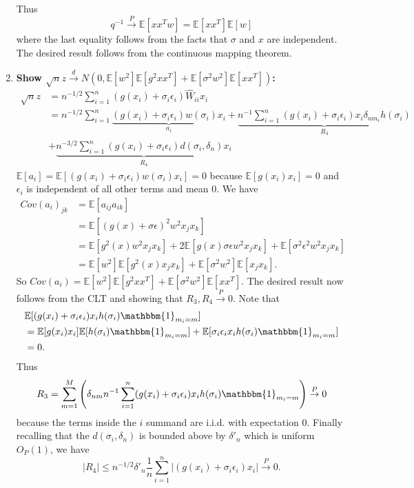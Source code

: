 \documentclass[ejs,ps,preprint]{imsart}
\numberwithin{equation}{section}
\theoremstyle{plain}
\newcommand{\E}{\mathbb{E}}
\newcommand{\ind}[1]{\mathbbm{1}_{#1}}
\newcommand{\rightarrowp}{\overset{P}{\to}}
\newcommand{\rightarrowd}{\overset{d}{\to}}
\def\E{\mathbb{E}}
\begin{document}
\begin{enumerate}
Thus 
\begin{equation*}
  q^{-1} \rightarrowp \E[xx^Tw] = \E[xx^T]\E[w]
\end{equation*}
where the last equality follows from the facts that $\sigma$ and $x$ are independent. The desired result follows from the continuous mapping theorem.
\item \textbf{Show $\sqrt{n}z \rightarrowd N(0,\E[w^2]\E[g^2xx^T] + \E[\sigma^2w^2]\E[xx^T])$:}\label{part:ii} 
\begin{align*}
\sqrt{n}z &= n^{-1/2} \sum_{i=1}^n (g(x_i) + \sigma_i\epsilon_i)\widehat{W}_{ii}x_{i}\\
&=n^{-1/2} \sum_{i=1}^n \underbrace{(g(x_i) + \sigma_i\epsilon_i)w(\sigma_i)x_{i}}_{a_i} + \underbrace{n^{-1}\sum_{i=1}^n (g(x_i) + \sigma_i\epsilon_i)x_i\delta_{nm_i}h(\sigma_i)}_{R_3} \\
&+ \underbrace{n^{-3/2}\sum_{i=1}^n(g(x_i) + \sigma_i\epsilon_i)d(\sigma_i,\delta_n)x_i}_{R_4}
\end{align*}
$\E[a_i] = \E[(g(x_i) + \sigma_i\epsilon_i)w(\sigma_i)x_{i}] = 0$ because $\E[g(x_i)x_i] = 0$ and $\epsilon_i$ is independent of all other terms and mean $0$. We have 
\begin{align*}
Cov(a_i)_{jk} &= \E[a_{ij}a_{ik}] \\
&= \E[(g(x) + \sigma\epsilon)^2w^2x_jx_k]\\
&= \E[g^2(x)w^2x_jx_k] + 2\E[g(x)\sigma\epsilon w^2x_jx_k] + \E[\sigma^2\epsilon^2w^2x_jx_k]\\
&= \E[w^2]\E[g^2(x)x_jx_k] + \E[\sigma^2w^2]\E[x_jx_k].
\end{align*}
So $Cov(a_i) = \E[w^2]\E[g^2xx^T] + \E[\sigma^2w^2]\E[xx^T]$.  The desired result now follows from the CLT and showing that $R_3,R_4 \rightarrowp 0$. Note that
\begin{align*}
  &\E[(g(x_i) + \sigma_i\epsilon_i)x_ih(\sigma_i)\ind{m_i=m}]\\
  &= \E[g(x_i)x_i]\E[h(\sigma_i)\ind{m_i=m}] + \E[\sigma_i\epsilon_ix_ih(\sigma_i)\ind{m_i=m}]\\
  &= 0.
\end{align*}
Thus
\begin{equation*}
R_3 = \sum_{m=1}^M \left(\delta_{nm} n^{-1} \sum_{i=1}^n (g(x_i) + \sigma_i\epsilon_i)x_ih(\sigma_i) \ind{m_i=m}\right) \rightarrowp 0
\end{equation*}
because the terms inside the $i$ summand are i.i.d. with expectation $0$. Finally recalling that the $d(\sigma_i,\delta_n)$ is bounded above by $\delta'_n$ which is uniform $O_P(1)$, we have
\begin{equation*}
|R_{4}| \leq n^{-1/2}\delta'_n\frac{1}{n}\sum_{i=1}^n\left|(g(x_i) + \sigma_i\epsilon_i)x_{i}\right| \rightarrowp 0.
\end{equation*}

\end{enumerate}
\end{document}

